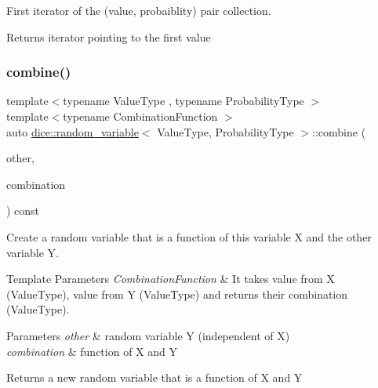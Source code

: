 First iterator of the (value, probaiblity) pair collection. 

\begin{DoxyReturn}{Returns}
iterator pointing to the first value 
\end{DoxyReturn}
\mbox{\label{classdice_1_1random__variable_a6aa92a82cfccdefe467410ec8e0d4dc7}} 
\subsubsection{\texorpdfstring{combine()}{combine()}}
{\footnotesize\ttfamily template$<$typename Value\+Type , typename Probability\+Type $>$ \\
template$<$typename Combination\+Function $>$ \\
auto \mbox{\hyperlink{classdice_1_1random__variable}{dice\+::random\+\_\+variable}}$<$ Value\+Type, Probability\+Type $>$\+::combine (\begin{DoxyParamCaption}\item[{const \mbox{\hyperlink{classdice_1_1random__variable}{random\+\_\+variable}}$<$ Value\+Type, Probability\+Type $>$ \&}]{other,  }\item[{Combination\+Function}]{combination }\end{DoxyParamCaption}) const\hspace{0.3cm}{\ttfamily [inline]}}



Create a random variable that is a function of this variable X and the other variable Y. 


\begin{DoxyTemplParams}{Template Parameters}
{\em Combination\+Function} & It takes value from X (Value\+Type), value from Y (Value\+Type) and returns their combination (Value\+Type).\\
\hline
\end{DoxyTemplParams}

\begin{DoxyParams}{Parameters}
{\em other} & random variable Y (independent of X) \\
\hline
{\em combination} & function of X and Y\\
\hline
\end{DoxyParams}
\begin{DoxyReturn}{Returns}
a new random variable that is a function of X and Y 
\end{DoxyReturn}
\mbox{\label{classdice_1_1random__variable_ae72311eea3b8ad6c66893c2af3489d74}} 

